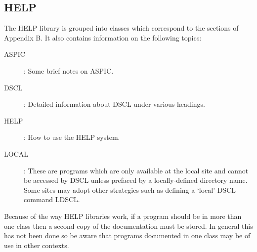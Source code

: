 \subsection {HELP}
The HELP library is grouped into classes which correspond to the sections of
Appendix B.
It also contains information on the following topics:
\begin{description}
\begin{description}
\item [ASPIC]: Some brief notes on ASPIC.
\item [DSCL]: Detailed information about DSCL under various headings.
\item [HELP]: How to use the HELP system.
\item [LOCAL]: These are programs which are only available at the local site and
cannot be accessed by DSCL unless prefaced by a locally-defined directory name.
Some sites may adopt other strategies such as defining a `local' DSCL command
LDSCL.
\end{description}
\end{description}
Because of the way HELP libraries work, if a program should be in more than one
class then a second copy of the documentation must be stored.
In general this has not been done so be aware that programs documented in one
class may be of use in other contexts.
